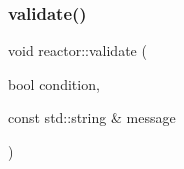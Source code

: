 \mbox{\label{namespacereactor_afb17997129c7498eff1148813c8970d0}} 
\subsubsection{\texorpdfstring{validate()}{validate()}}
{\footnotesize\ttfamily void reactor\+::validate (\begin{DoxyParamCaption}\item[{bool}]{condition,  }\item[{const std\+::string \&}]{message }\end{DoxyParamCaption})\hspace{0.3cm}{\ttfamily [inline]}}

